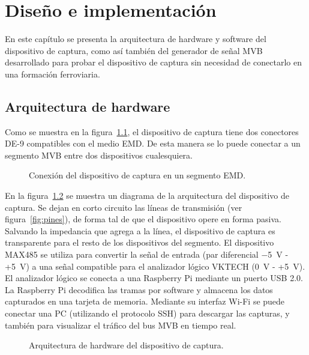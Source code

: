 \chapter{Diseño e implementación}
\label{cap:DisenioImplementacion}

En este capítulo se presenta la arquitectura de hardware y software del dispositivo de captura, como así también del generador de señal MVB desarrollado para probar el dispositivo de captura sin necesidad de conectarlo en una formación ferroviaria.

\section{Arquitectura de hardware}
\label{sec:hardware}

Como se muestra en la figura~\ref{fig:conexion}, el dispositivo de captura tiene dos conectores DE-9 compatibles con el medio EMD. De esta manera se lo puede conectar a un segmento MVB entre dos dispositivos cualesquiera.

\begin{figure}[htbp]
	\centering
    {
        \fontsize{8pt}{8pt}\selectfont
        
    }
	\caption{Conexión del dispositivo de captura en un segmento EMD.}
    \label{fig:conexion}
\end{figure}

En la figura~\ref{fig:bloques} se muestra un diagrama de la arquitectura del dispositivo de captura.
Se dejan en corto circuito las líneas de transmisión (ver figura~\ref{fig:pines}), de forma tal de que el dispositivo opere en forma pasiva. Salvando la impedancia que agrega a la línea, el dispositivo de captura es transparente para el resto de los dispositivos del segmento.
El dispositivo MAX485 \cite{max485} se utiliza para convertir la señal de entrada (par diferencial $-$5~V - +5~V) a una señal compatible para el analizador lógico VKTECH (0~V - +5~V). El analizador lógico se conecta a una Raspberry Pi mediante un puerto USB 2.0. La Raspberry Pi decodifica las tramas por software y almacena los datos capturados en una tarjeta de memoria. Mediante su interfaz Wi-Fi se puede conectar una PC (utilizando el protocolo SSH) para descargar las capturas, y también para visualizar el tráfico del bus MVB en tiempo real.

\begin{figure}[htbp]
	\centering
    {
        \fontsize{8pt}{8pt}\selectfont
        
    }
	\caption{Arquitectura de hardware del dispositivo de captura.}
    \label{fig:bloques}
\end{figure}

